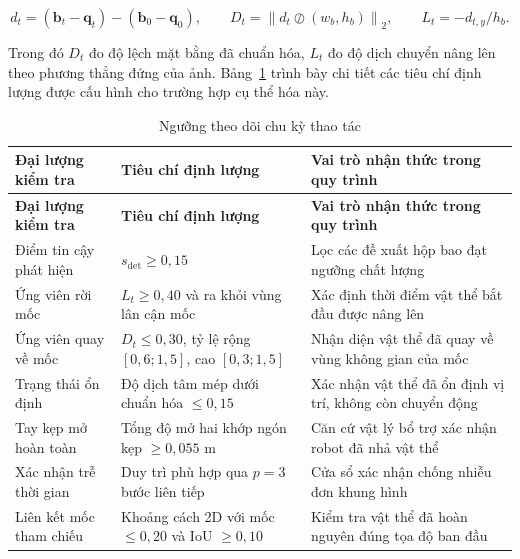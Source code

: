 \begin{equation}
d_t = (\mathbf b_t - \mathbf q_t) - (\mathbf b_0 - \mathbf q_0),\qquad
D_t = \left\| d_t \oslash (w_b, h_b) \right\|_2,\qquad
L_t = -d_{t,y} / h_b.
\label{eq:case-study-geometry}
\end{equation}

Trong đó $D_t$ đo độ lệch mặt bằng đã chuẩn hóa, $L_t$ đo độ dịch chuyển nâng lên theo phương thẳng đứng của ảnh. Bảng~\ref{tab:case-study-thresholds} trình bày chi tiết các tiêu chí định lượng được cấu hình cho trường hợp cụ thể hóa này.

\begingroup\small\setlength{\tabcolsep}{4pt}\renewcommand{\arraystretch}{1.15}
\begin{longtable}{|>{\raggedright\arraybackslash}p{}|>{\raggedright\arraybackslash}p{}|>{\raggedright\arraybackslash}p{}|}
\caption{Ngưỡng theo dõi chu kỳ thao tác}\label{tab:case-study-thresholds}\\
\hline
\textbf{Đại lượng kiểm tra} & \textbf{Tiêu chí định lượng} & \textbf{Vai trò nhận thức trong quy trình} \\ \hline
\endfirsthead
\hline
\textbf{Đại lượng kiểm tra} & \textbf{Tiêu chí định lượng} & \textbf{Vai trò nhận thức trong quy trình} \\ \hline
\endhead
\hline\endfoot
Điểm tin cậy phát hiện & $s_{\mathrm{det}} \ge 0{,}15$ & Lọc các đề xuất hộp bao đạt ngưỡng chất lượng \\ \hline
Ứng viên rời mốc & $L_t \ge 0{,}40$ và ra khỏi vùng lân cận mốc & Xác định thời điểm vật thể bắt đầu được nâng lên \\ \hline
Ứng viên quay về mốc & $D_t \le 0{,}30$, tỷ lệ rộng $[0{,}6; 1{,}5]$, cao $[0{,}3; 1{,}5]$ & Nhận diện vật thể đã quay về vùng không gian của mốc \\ \hline
Trạng thái ổn định & Độ dịch tâm mép dưới chuẩn hóa $\le 0{,}15$ & Xác nhận vật thể đã ổn định vị trí, không còn chuyển động \\ \hline
Tay kẹp mở hoàn toàn & Tổng độ mở hai khớp ngón kẹp $\ge 0{,}055$ m & Căn cứ vật lý bổ trợ xác nhận robot đã nhả vật thể \\ \hline
Xác nhận trễ thời gian & Duy trì phù hợp qua $p = 3$ bước liên tiếp & Cửa sổ xác nhận chống nhiễu đơn khung hình \\ \hline
Liên kết mốc tham chiếu & Khoảng cách 2D với mốc $\le 0{,}20$ và IoU $\ge 0{,}10$ & Kiểm tra vật thể đã hoàn nguyên đúng tọa độ ban đầu \\ \hline
\end{longtable}
\endgroup

